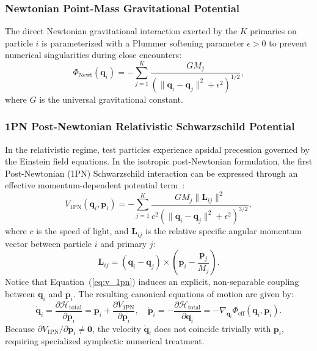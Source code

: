 \documentclass[preprint,12pt,3p]{elsarticle}
\begin{document}
\subsubsection{Newtonian Point-Mass Gravitational Potential}
The direct Newtonian gravitational interaction exerted by the $K$ primaries on particle $i$ is parameterized with a Plummer softening parameter $\epsilon > 0$ to prevent numerical singularities during close encounters:
\begin{equation}
\Phi_{\mathrm{Newt}}(\bm{q}_i) = -\sum_{j=1}^{K} \frac{G M_j}{\left( \|\bm{q}_i - \bm{q}_j\|^2 + \epsilon^2 \right)^{1/2}},
\label{eq:phi_newtonian}
\end{equation}
where $G$ is the universal gravitational constant.

\subsubsection{1PN Post-Newtonian Relativistic Schwarzschild Potential}
In the relativistic regime, test particles experience apsidal precession governed by the Einstein field equations. In the isotropic post-Newtonian formulation, the first Post-Newtonian (1PN) Schwarzschild interaction can be expressed through an effective momentum-dependent potential term~\cite{damour1985general,blanchet2014gravitational}:
\begin{equation}
V_{1\mathrm{PN}}(\bm{q}_i, \bm{p}_i) = -\sum_{j=1}^{K} \frac{G M_j \|\bm{L}_{ij}\|^2}{c^2 \left( \|\bm{q}_i - \bm{q}_j\|^2 + \epsilon^2 \right)^{3/2}},
\label{eq:v_1pn}
\end{equation}
where $c$ is the speed of light, and $\bm{L}_{ij}$ is the relative specific angular momentum vector between particle $i$ and primary $j$:
\begin{equation}
\bm{L}_{ij} = (\bm{q}_i - \bm{q}_j) \times \left( \bm{p}_i - \frac{\bm{p}_j}{M_j} \right).
\label{eq:angular_momentum_rel}
\end{equation}
Notice that Equation~(\ref{eq:v_1pn}) induces an explicit, non-separable coupling between $\bm{q}_i$ and $\bm{p}_i$. The resulting canonical equations of motion are given by:
\begin{equation}
\dot{\bm{q}}_i = \frac{\partial \mathcal{H}_{\mathrm{total}}}{\partial \bm{p}_i} = \bm{p}_i + \frac{\partial V_{1\mathrm{PN}}}{\partial \bm{p}_i}, \quad \dot{\bm{p}}_i = -\frac{\partial \mathcal{H}_{\mathrm{total}}}{\partial \bm{q}_i} = -\nabla_{\bm{q}_i} \Phi_{\mathrm{eff}}(\bm{q}_i, \bm{p}_i).
\label{eq:canonical_flow}
\end{equation}
Because $\partial V_{1\mathrm{PN}} / \partial \bm{p}_i \neq \bm{0}$, the velocity $\dot{\bm{q}}_i$ does not coincide trivially with $\bm{p}_i$, requiring specialized symplectic numerical treatment.
\end{document}
